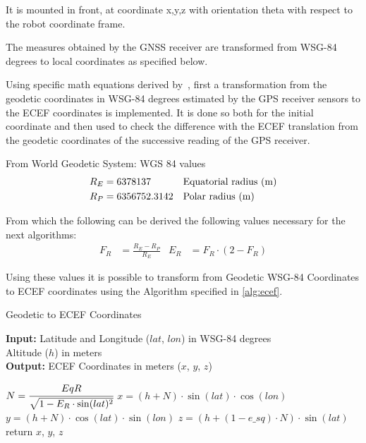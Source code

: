 It is mounted in front, at coordinate x,y,z with orientation theta with respect to the robot coordinate frame.

\noindent The measures obtained by the \gls{GNSS} receiver are transformed from WSG-84 degrees to local coordinates as specified below.

Using specific math equations derived by~\cite{Vincenty}, first a transformation from the geodetic coordinates in WSG-84 degrees estimated by the GPS receiver sensors to the ECEF coordinates is implemented.
It is done so both for the initial coordinate and then used to check the difference with the ECEF translation from the geodetic coordinates of the successive reading of the GPS receiver.



From World Geodetic System: WGS 84 values
\begin{align}
    R_E &= 6378137 && \text{Equatorial radius (\SI{}{\meter})} \\
    R_P &= 6356752.3142 && \text{Polar radius (\SI{}{\meter})}
\end{align}

From which the following can be derived the following values necessary for the next algorithms:
\begin{align}
    F_R &= \frac{R_E - R_P}{R_E} &
    E_R &= F_R \cdot (2-F_R)
\end{align}

Using these values it is possible to transform from Geodetic WSG-84 Coordinates to ECEF coordinates using the  Algorithm specified in \ref{alg:ecef}.


\begin{algorithm}[ht!]
\caption{Geodetic to ECEF Coordinates }
\label{alg:ecef}
  \hspace*{\algorithmicindent} \textbf{Input:} Latitude and Longitude ($lat$, $lon$) in WSG-84 degrees\\
  \hspace*{4em} Altitude ($h$) in meters\\
  \hspace*{\algorithmicindent} \textbf{Output:} ECEF Coordinates in meters ($x$, $y$, $z$)
  \begin{algorithmic}[1]
  \STATE $N = \cfrac{EqR}{\sqrt{1 - E_R \cdot \sin(lat)^2}}$
  \STATE $x = (h + N) \cdot \sin(lat) \cdot \cos(lon)$
  \STATE $y = (h + N) \cdot \cos(lat) \cdot \sin(lon)$
  \STATE $z = (h + (1 - e\_sq) \cdot N) \cdot \sin(lat)$
  \STATE return $x$, $y$, $z$
    \end{algorithmic}
\end{algorithm}

